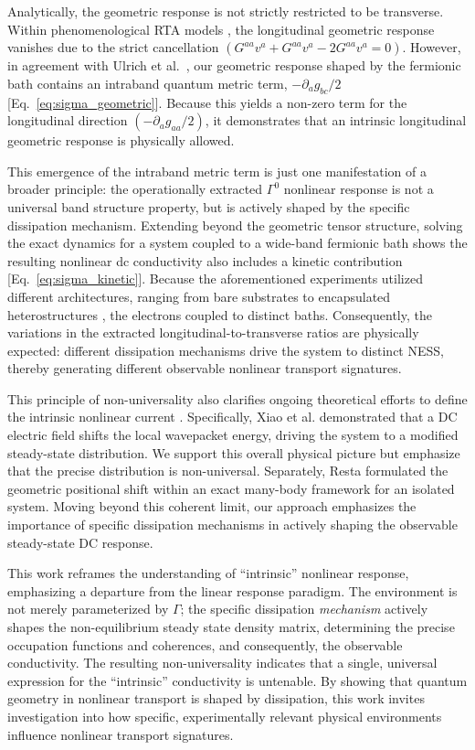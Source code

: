 \documentclass[twocolumn, prx, reprint, amsfonts, amsmath, amssymb, longbibliography, floatfix, aps]{revtex4-2}
\begin{document}
Analytically, the geometric response is not strictly restricted to be transverse. Within phenomenological RTA models \cite{qiang2025clarification,xiao2025proper}, the longitudinal geometric response vanishes due to the strict cancellation $(G^{a a} v^a+ G^{a a} v^a-2 G^{a a} v^a=0)$. 
However, in agreement with Ulrich et al.~\cite{ulrich2025quantum}, our geometric response shaped by the fermionic bath contains an intraband quantum metric term, $- \partial_a g_{b c} / 2$ [Eq.~\eqref{eq:sigma_geometric}].
Because this yields a non-zero term for the longitudinal direction $(- \partial_a g_{a a} / 2)$, it demonstrates that an intrinsic longitudinal geometric response is physically allowed.

This emergence of the intraband metric term is just one manifestation of a broader principle: the operationally extracted $\Gamma^0$ nonlinear response is not a universal band structure property, but is actively shaped by the specific dissipation mechanism. Extending beyond the geometric tensor structure, solving the exact dynamics for a system coupled to a wide-band fermionic bath shows the resulting nonlinear dc conductivity also includes a kinetic contribution [Eq.~\eqref{eq:sigma_kinetic}]. Because the aforementioned experiments utilized different architectures, ranging from bare substrates \cite{wang2023quantum} to encapsulated heterostructures \cite{gao2023quantum,gao2024antiferromagnetic}, the electrons coupled to distinct baths. Consequently, the variations in the extracted longitudinal-to-transverse ratios are physically expected: different dissipation mechanisms drive the system to distinct NESS, thereby generating different observable nonlinear transport signatures.

This principle of non-universality also clarifies ongoing theoretical efforts to define the intrinsic nonlinear current \cite{xiao2025proper, resta2025intrinsic}. Specifically, Xiao et al. \cite{xiao2025proper} demonstrated that a DC electric field shifts the local wavepacket energy, driving the system to a modified steady-state distribution. We support this overall physical picture but emphasize that the precise distribution is non-universal. Separately, Resta \cite{resta2025intrinsic} formulated the geometric positional shift within an exact many-body framework for an isolated system. Moving beyond this coherent limit, our approach emphasizes the importance of specific dissipation mechanisms in actively shaping the observable steady-state DC response.

This work reframes the understanding of ``intrinsic'' nonlinear response, emphasizing a departure from the linear response paradigm. 
The environment is not merely parameterized by $\Gamma$;
the specific dissipation {\it mechanism} actively shapes the non-equilibrium steady state density matrix, determining the precise occupation functions and coherences, and consequently, the observable conductivity.
The resulting non-universality indicates that a single, universal expression for the ``intrinsic'' conductivity is untenable. 
By showing that quantum geometry in nonlinear transport is shaped by dissipation, this work invites investigation into how specific, experimentally relevant physical environments influence nonlinear transport signatures.
\end{document}
